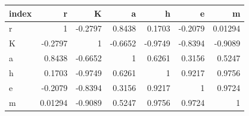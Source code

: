 \begin{tabular}{lrrrrrr}
\toprule
index & r & K & a & h & e & m \\
\midrule
r & 1 & -0.2797 & 0.8438 & 0.1703 & -0.2079 & 0.01294 \\
K & -0.2797 & 1 & -0.6652 & -0.9749 & -0.8394 & -0.9089 \\
a & 0.8438 & -0.6652 & 1 & 0.6261 & 0.3156 & 0.5247 \\
h & 0.1703 & -0.9749 & 0.6261 & 1 & 0.9217 & 0.9756 \\
e & -0.2079 & -0.8394 & 0.3156 & 0.9217 & 1 & 0.9724 \\
m & 0.01294 & -0.9089 & 0.5247 & 0.9756 & 0.9724 & 1 \\
\bottomrule
\end{tabular}
